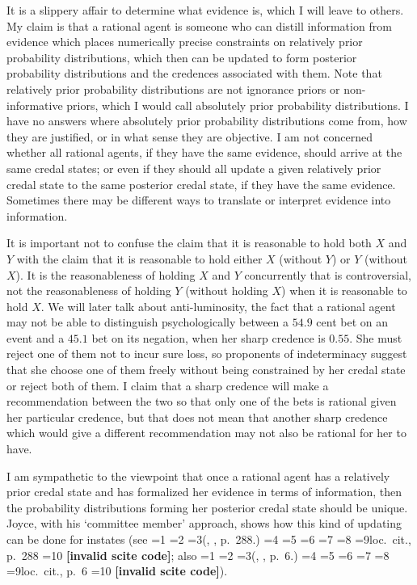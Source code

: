 \documentclass[journal]{IEEEtran}
\newcommand{\qnull}[1]{`#1'}
\newif\ifNumericalOrYear
\newcommand{\PageP}{p.~}
\newcommand{\PageP}{}
\newcommand{\scite}[3]{\ifnum#1=1\ifNumericalOrYear\citep{#2}\else\citeyearpar{#2}\fi\else
\ifnum#1=2\ifNumericalOrYear\citep[#3]{#2}\else\citep[{\PageP}#3]{#2}\fi\else
\ifnum#1=3\ifNumericalOrYear(\citet[#3]{#2})\else(\citeauthor{#2}, \citeyear{#2}, {\PageP}#3.)\fi\else
\ifnum#1=4\ifNumericalOrYear\citet{#2}\else\citet{#2}\fi\else
\ifnum#1=5\ifNumericalOrYear(\citet{#2})\else\citep{#2}\fi\else
\ifnum#1=6\ifNumericalOrYear(\citet[#3]{#2})\else\citep[{\PageP}#3]{#2}\fi\else
\ifnum#1=7\ifNumericalOrYear\citep{#2}\else\citealp{#2}\fi\else
\ifnum#1=8\ifNumericalOrYear\citep[#3]{#2}\else\citealp[{\PageP}#3]{#2}\fi\else
\ifnum#1=9\ifNumericalOrYear\citep[#3]{#2}\else{}loc.\ cit., {\PageP}#3\fi\else
\ifnum#1=10\ifNumericalOrYear\citep{#2}\else\citeyear{#2}\fi\else
\textbf{[invalid scite code]}\fi\fi\fi\fi\fi\fi\fi\fi\fi\fi}
\begin{document}
It is a slippery affair to determine what evidence is,
which I will leave to others. My claim is that a rational agent is
someone who can distill information from evidence which places
numerically precise constraints on relatively prior probability
distributions, which then can be updated to form posterior probability
distributions and the credences associated with them. Note that
relatively prior probability distributions are not ignorance priors or
non-informative priors, which I would call absolutely prior
probability distributions. I have no answers where absolutely prior
probability distributions come from, how they are justified, or in
what sense they are objective. I am not concerned whether all rational
agents, if they have the same evidence, should arrive at the same
credal states; or even if they should all update a given relatively
prior credal state to the same posterior credal state, if they have
the same evidence. Sometimes there may be different ways to translate
or interpret evidence into information.

It is important not to confuse the claim that it is reasonable to hold
both $X$ and $Y$ with the claim that it is reasonable to hold either
$X$ (without $Y$) or $Y$ (without $X$). It is the reasonableness of
holding $X$ and $Y$ concurrently that is controversial, not the
reasonableness of holding $Y$ (without holding $X$) when it is
reasonable to hold $X$. We will later talk about anti-luminosity, the
fact that a rational agent may not be able to distinguish
psychologically between a $54.9$ cent bet on an event and a $45.1$ bet
on its negation, when her sharp credence is $0.55$. She must reject
one of them not to incur sure loss, so proponents of indeterminacy
suggest that she choose one of them freely without being constrained
by her credal state or reject both of them. I claim that a sharp
credence will make a recommendation between the two so that only one
of the bets is rational given her particular credence, but that does
not mean that another sharp credence which would give a different
recommendation may not also be rational for her to have.

I am sympathetic to the viewpoint that once a rational agent has a
relatively prior credal state and has formalized her evidence in terms
of information, then the probability distributions forming her
posterior credal state should be unique. Joyce, with his
\qnull{committee member} approach, shows how this kind of updating can
be done for instates (see \scite{8}{joyce10}{288}; also
\scite{8}{bradleysteele13}{6}).
\end{document}
